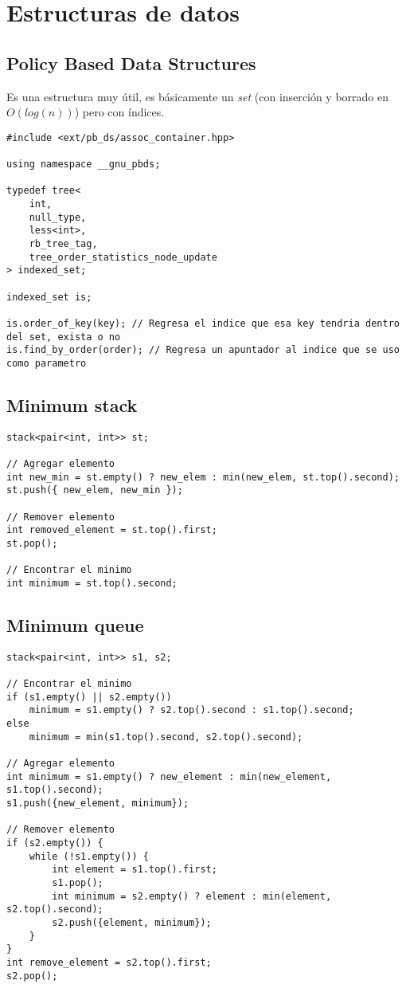 \documentclass[10pt]{article}
\begin{document}
\section{Estructuras de datos}

\subsection{Policy Based Data Structures}

Es una estructura muy útil, es básicamente un \textit{set} (con inserción y borrado en $O(log(n))$) pero con índices.

\begin{lstlisting}
#include <ext/pb_ds/assoc_container.hpp>

using namespace __gnu_pbds;

typedef tree<
    int,
    null_type,
    less<int>,
    rb_tree_tag,
    tree_order_statistics_node_update
> indexed_set;

indexed_set is;

is.order_of_key(key); // Regresa el indice que esa key tendria dentro del set, exista o no
is.find_by_order(order); // Regresa un apuntador al indice que se uso como parametro
\end{lstlisting}

\subsection{Minimum stack}

\begin{lstlisting}
stack<pair<int, int>> st;

// Agregar elemento
int new_min = st.empty() ? new_elem : min(new_elem, st.top().second);
st.push({ new_elem, new_min });

// Remover elemento
int removed_element = st.top().first;
st.pop();

// Encontrar el minimo
int minimum = st.top().second;
\end{lstlisting}

\subsection{Minimum queue}

\begin{lstlisting}
stack<pair<int, int>> s1, s2;

// Encontrar el minimo
if (s1.empty() || s2.empty()) 
    minimum = s1.empty() ? s2.top().second : s1.top().second;
else
    minimum = min(s1.top().second, s2.top().second);

// Agregar elemento
int minimum = s1.empty() ? new_element : min(new_element, s1.top().second);
s1.push({new_element, minimum});

// Remover elemento
if (s2.empty()) {
    while (!s1.empty()) {
        int element = s1.top().first;
        s1.pop();
        int minimum = s2.empty() ? element : min(element, s2.top().second);
        s2.push({element, minimum});
    }
}
int remove_element = s2.top().first;
s2.pop();
\end{lstlisting}
\end{document}
